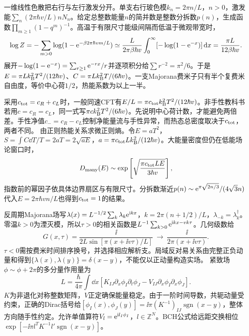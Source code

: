 \label{ch:chiral}
一维线性色散把右行与左行激发分开。单支右行玻色模$k_n=2\pi n/L$，$n>0$，激发能$\sum_n(2\pi\hbar v/L)nN_n$。给定总整数能量$n$的简并数是整数分拆数$p(n)$，生成函数$\prod_{m\ge1}(1-q^m)^{-1}$。高温于有限尺寸能级间隔而低温于微观带宽时，
\begin{equation}
\log Z=-\sum_{m>0}\log(1-\mathrm e^{-\beta 2\pi\hbar vm/L})\simeq\frac L{2\pi\beta\hbar v}\int_0^\infty[-\log(1-\mathrm e^{-x})]\,\mathrm d x=\frac{\pi L}{12\beta\hbar v}.
\end{equation}
展开$-\log(1-\mathrm e^{-x})=\sum_{r\ge1}\mathrm e^{-rx}/r$并逐项积分给$\sum r^{-2}=\pi^2/6$。于是$E=\pi Lk_{\mathrm B}^2T^2/(12\hbar v)$、$C=\pi Lk_{\mathrm B}^2T/(6\hbar v)$。一支Majorana费米子只有半个复费米自由度，等价中心荷$1/2$，热能系数为以上一半。

采用$ c_{\rm tot}=c_R+c_L$时，一般同速CFT有$E/L=\pi c_{\rm tot}k_{\mathrm B}^2T^2/(12\hbar v)$。非手性教科书若用$c=c_R=c_L$，同一式写$\pi ck_{\mathrm B}^2T^2/(6\hbar v)$。先说明中心荷计数，才能避免两倍差。手性净值$c_-=c_R-c_L$控制净能量流与手性异常，而热态总密度取决于$c_{\rm tot}$，两者不同。
由正则热能关系求微正则熵。令$E=aT^2$，$S=\int C\dd T/T=2aT=2\sqrt{aE}$，$a=\pi c_{\rm tot}Lk_{\mathrm B}^2/(12\hbar v)$。大能量密度但仍在低能场论窗口时，
\begin{equation}
D_{\rm many}(E)\sim\exp\left[\sqrt{\frac{\pi c_{\rm tot}LE}{3\hbar v}}\right],
\end{equation}
指数前的幂因子依具体边界扇区与有限尺寸。分拆数渐近$p(n)\sim\mathrm e^{\pi\sqrt{2n/3}}/(4\sqrt3n)$代入$E=2\pi\hbar vn/L$也得到$c_{\rm tot}=1$的结果。

反周期Majorana场写$\lambda(x)=L^{-1/2}\sum_k\lambda_k\mathrm e^{\mathrm i kx}$，$k=2\pi(n+1/2)/L$，$\lambda_{-k}=\lambda_k^\dagger$。零温$k>0$为湮灭模，所以$\tau>0$的相关函数是$L^{-1}\sum_{k>0}\mathrm e^{\mathrm i kx-vk\tau}$。几何级数给
\begin{equation}
G(x,\tau)=\frac{\ii}{2L\sin[\pi(x+\ii v\tau)/L]}\ \longrightarrow\ \frac{\ii}{2\pi(x+\ii v\tau)}.
\end{equation}
$\tau<0$需按费米时间排序换号，并选择相应解析支。局域反对易关系由完整正负动量和得到$\{\lambda(x),\lambda(y)\}=\delta(x-y)$，不能仅以正动量构造实场。
紧致场$\phi\sim\phi+2\pi$的多分量作用量为
\begin{equation}
L=\frac\hbar{4\pi}\int\dd x[K_{IJ}\partial_x\phi_I\partial_t\phi_J-V_{IJ}\partial_x\phi_I\partial_x\phi_J].
\end{equation}
$K$为非退化对称整数矩阵，$V$正定确保能量稳定。由于一阶时间导数，共轭动量受约束，正确的Dirac括号给$[\phi_I(x),\phi_J(y)]=\ii\pi(K^{-1})_{IJ}\operatorname{sgn}(x-y)$，整体方向随手性约定。允许单值算符$V_l=\mathrm e^{\mathrm i l_I\phi_I}$，$l\in\mathbb Z^N$。BCH公式给远距交换相位$\exp[-\ii\pi l^TK^{-1}l'\operatorname{sgn}(x-y)]$。

